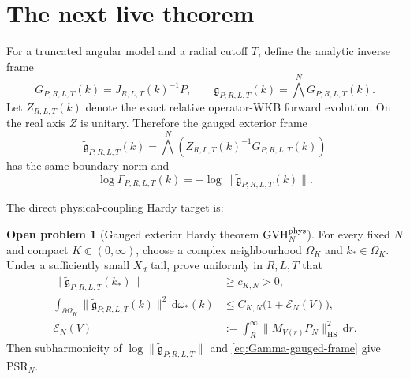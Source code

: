 \documentclass[11pt]{article}
\newcommand{\dd}{\,\mathrm d}
\newcommand{\cE}{\mathcal E}
\newcommand{\HS}{\mathrm{HS}}
\theoremstyle{definition}
\newtheorem{problem}[proposition]{Open problem}
\begin{document}
\section{The next live theorem}

For a truncated angular model and a radial cutoff $T$, define the analytic
inverse frame
\begin{equation}
 G_{P;R,L,T}(k)=J_{R,L,T}(k)^{-1}P,
 \qquad
 \mathfrak g_{P;R,L,T}(k)=\bigwedge^N G_{P;R,L,T}(k).
 \label{eq:inverse-frame}
\end{equation}
Let $Z_{R,L,T}(k)$ denote the exact relative operator-WKB forward evolution.
On the real axis $Z$ is unitary.  Therefore the gauged exterior frame
\begin{equation}
 \widetilde{\mathfrak g}_{P;R,L,T}(k)
 =\bigwedge^N\!\left(Z_{R,L,T}(k)^{-1}G_{P;R,L,T}(k)\right)
 \label{eq:gauged-inverse-frame}
\end{equation}
has the same boundary norm and
\begin{equation}
 \log\Gamma_{P;R,L,T}(k)
 =-\log\|\widetilde{\mathfrak g}_{P;R,L,T}(k)\|.
 \label{eq:Gamma-gauged-frame}
\end{equation}

The direct physical-coupling Hardy target is:
\begin{problem}[Gauged exterior Hardy theorem $\mathrm{GVH}_N^{\rm phys}$]
\label{prob:gvhn-physical}
For every fixed $N$ and compact $K\Subset(0,\infty)$, choose a complex
neighbourhood $\Omega_K$ and $k_*\in\Omega_K$.  Under a sufficiently small
$X_d$ tail, prove uniformly in $R,L,T$ that
\begin{align}
 \|\widetilde{\mathfrak g}_{P;R,L,T}(k_*)\|
 &\geq c_{K,N}>0,
 \label{eq:gvhn-interior}\\
 \int_{\partial\Omega_K}
 \|\widetilde{\mathfrak g}_{P;R,L,T}(k)\|^2
 \dd\omega_*(k)
 &\leq C_{K,N}\bigl(1+\cE_N(V)\bigr),
 \label{eq:gvhn-boundary}\\
 \cE_N(V)
 &:=\int_R^\infty\|M_{V(r)}P_N\|_{\HS}^2\dd r.
 \label{eq:EN}
\end{align}
Then subharmonicity of
$\log\|\widetilde{\mathfrak g}_{P;R,L,T}\|$ and
\eqref{eq:Gamma-gauged-frame} give PSR$_N$.
\end{problem}
\end{document}
